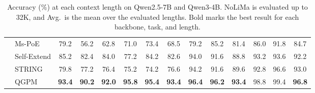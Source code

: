 \documentclass[11pt]{article}
\begin{document}
\begin{table}[t]
\begin{tabular*}{\textwidth}{@{\extracolsep{\fill}} ll cccccc @{\hspace{10pt}} cccccc @{}}
 & Ms-PoE & \phantom{0}79.2 & \phantom{0}56.2 & \phantom{0}62.8 & \phantom{0}71.0 & \phantom{0}73.4 & \phantom{0}68.5 & \phantom{0}79.2 & \phantom{0}85.2 & \phantom{0}81.4 & \phantom{0}86.0 & \phantom{0}91.8 & \phantom{0}84.7 \\
 & Self-Extend & \phantom{0}85.2 & \phantom{0}82.4 & \phantom{0}84.0 & \phantom{0}77.2 & \phantom{0}84.2 & \phantom{0}82.6 & \phantom{0}94.0 & \phantom{0}91.6 & \phantom{0}88.8 & \phantom{0}93.2 & \phantom{0}93.6 & \phantom{0}92.2 \\
 & STRING & \phantom{0}79.8 & \phantom{0}77.2 & \phantom{0}76.4 & \phantom{0}75.2 & \phantom{0}74.2 & \phantom{0}76.6 & \phantom{0}94.2 & \phantom{0}91.6 & \phantom{0}89.6 & \phantom{0}92.8 & \phantom{0}96.6 & \phantom{0}93.0 \\
 & QGPM & \textbf{\phantom{0}93.4} & \textbf{\phantom{0}90.2} & \textbf{\phantom{0}92.0} & \textbf{\phantom{0}95.8} & \textbf{\phantom{0}95.4} & \textbf{\phantom{0}93.4} & \textbf{\phantom{0}96.4} & \textbf{\phantom{0}96.2} & \textbf{\phantom{0}93.4} & \phantom{0}98.8 & \phantom{0}99.4 & \textbf{\phantom{0}96.8} \\
\bottomrule
\end{tabular*}
\caption{Accuracy (\%) at each context length on Qwen2.5-7B and Qwen3-4B. NoLiMa is evaluated up to 32K, and Avg.\ is the mean over the evaluated lengths. Bold marks the best result for each backbone, task, and length.}
\label{tab:full-qwen}
\end{table}
\end{document}
